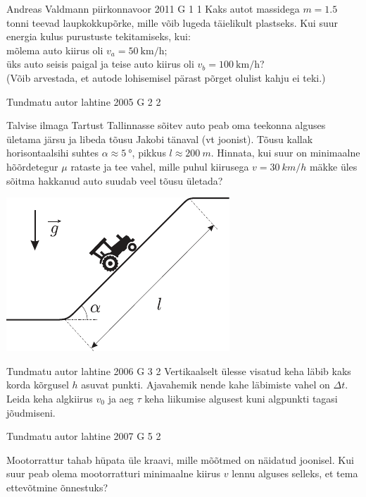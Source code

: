 \documentclass[11pt]{article}
\begin{document}
{%
{Andreas Valdmann} %
{piirkonnavoor} %
{2011} %
{G 1} %
{1} %
{
\ifStatement
Kaks autot massidega $m=\SI{1,5}{}$ tonni teevad laupkokkupõrke, mille võib lugeda täielikult plastseks. Kui suur energia kulus purustuste tekitamiseks, kui:\\
\osa mõlema auto kiirus oli $v_a=\SI{50}{\kilo\metre\per\hour}$; \\
\osa üks auto seisis paigal ja teise auto kiirus oli $v_b=\SI{100}{\kilo\metre\per\hour}$?\\
(Võib arvestada, et autode lohisemisel pärast põrget olulist kahju ei teki.)
\fi
}

{Tundmatu autor} %
{lahtine} %
{2005} %
{G 2} %
{2} %
{
\ifStatement
Talvise ilmaga Tartust Tallinnasse sõitev auto peab oma teekonna alguses ületama järsu ja libeda tõusu Jakobi tänaval (vt joonist). Tõusu kallak horisontaalsihi suhtes $\alpha \approx \SI{5}{\degree}$, pikkus $l \approx \SI{200}{m}$. Hinnata, kui suur on minimaalne hõõrdetegur $\mu$ rataste ja tee vahel, mille puhul kiirusega $v = \SI{30}{km/h}$ mäkke üles sõitma hakkanud auto suudab veel tõusu ületada?

\begin{center}
	\includegraphics[width=0.5\linewidth]{2005-lahg-02-yl}
\end{center}
\fi
}

{Tundmatu autor} %
{lahtine} %
{2006} %
{G 3} %
{2} %
{
\ifStatement
Vertikaalselt ülesse visatud keha läbib kaks korda kõrgusel $h$ asuvat punkti. Ajavahemik nende kahe läbimiste vahel on $\Delta t$. Leida keha algkiirus $v_0$ ja aeg $\tau$ keha liikumise algusest kuni algpunkti tagasi jõudmiseni.
\fi
}

{Tundmatu autor} %
{lahtine} %
{2007} %
{G 5} %
{2} %
{
\ifStatement
Mootorrattur tahab hüpata üle kraavi, mille mõõtmed on näidatud joonisel. Kui suur peab olema mootorratturi minimaalne kiirus $v$ lennu alguses selleks, et tema ettevõtmine õnnestuks?

}}
\end{document}
